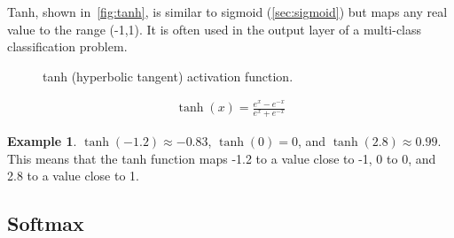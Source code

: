 \documentclass[oneside,11pt,dvipsnames]{book}
\numberwithin{equation}{section}
\theoremstyle{definition}
\newtheorem{example}{Example}[section]
\theoremstyle{remark}
\begin{document}
Tanh, shown in~\autoref{fig:tanh}, is similar to sigmoid (\autoref{sec:sigmoid})  but maps any real value to the range (-1,1). It is often used in the output layer of a multi-class classification problem.

\begin{figure}[htp]
    \centering
    \caption{tanh (hyperbolic tangent) activation function.}\label{fig:tanh}
\end{figure}

\begin{align}
\tanh(x) = \frac{e^x-e^{-x}}{e^x+e^{-x}}
\end{align}

\begin{example}
$\tanh(-1.2) \approx -0.83$, $\tanh(0) = 0$, and $\tanh(2.8) \approx 0.99$. This means that the tanh function maps -1.2 to a value close to -1, 0 to 0, and 2.8 to a value close to 1.
\end{example}

\subsection{Softmax}\label{sec:softmax}
\end{document}
